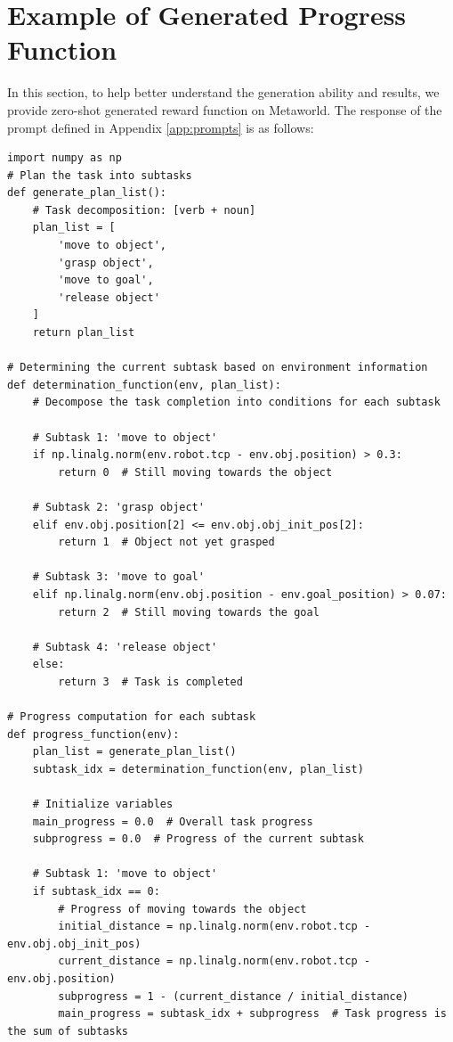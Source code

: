 \section{Example of Generated Progress Function}
In this section, to help better understand the generation ability and results, we provide zero-shot generated reward function on Metaworld. The response of the prompt defined in Appendix \ref{app:prompts} is as follows:

\begin{tcolorbox}[colframe=kuangyellow, colback=backgroundyellow, coltitle=black, title={LLM response in Metaworld-pick-place}, breakable]

\begin{lstlisting}
import numpy as np
# Plan the task into subtasks
def generate_plan_list():
    # Task decomposition: [verb + noun]
    plan_list = [
        'move to object',
        'grasp object',
        'move to goal',
        'release object'
    ]
    return plan_list

# Determining the current subtask based on environment information
def determination_function(env, plan_list):
    # Decompose the task completion into conditions for each subtask

    # Subtask 1: 'move to object'
    if np.linalg.norm(env.robot.tcp - env.obj.position) > 0.3:
        return 0  # Still moving towards the object

    # Subtask 2: 'grasp object'
    elif env.obj.position[2] <= env.obj.obj_init_pos[2]:
        return 1  # Object not yet grasped

    # Subtask 3: 'move to goal'
    elif np.linalg.norm(env.obj.position - env.goal_position) > 0.07:
        return 2  # Still moving towards the goal

    # Subtask 4: 'release object'
    else:
        return 3  # Task is completed

# Progress computation for each subtask
def progress_function(env):
    plan_list = generate_plan_list()
    subtask_idx = determination_function(env, plan_list)

    # Initialize variables
    main_progress = 0.0  # Overall task progress
    subprogress = 0.0  # Progress of the current subtask

    # Subtask 1: 'move to object'
    if subtask_idx == 0:
        # Progress of moving towards the object
        initial_distance = np.linalg.norm(env.robot.tcp - env.obj.obj_init_pos)
        current_distance = np.linalg.norm(env.robot.tcp - env.obj.position)
        subprogress = 1 - (current_distance / initial_distance)
        main_progress = subtask_idx + subprogress  # Task progress is the sum of subtasks


\end{lstlisting}
\end{tcolorbox}
